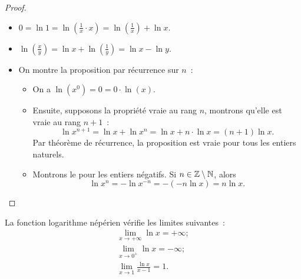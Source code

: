 \begin{proof}
    \begin{itemize}
        \item \( 0 = \ln 1 = \ln \left(\frac{1}{x} \cdot x \right) = \ln 
            \left(\frac{1}{x}\right) + \ln x \).
        \item \( \ln \left(\frac{x}{y}\right)=\ln x + \ln 
            \left(\frac{1}{y}\right)=\ln x - \ln y\).
        \item On montre la proposition par récurrence sur \(n\)~:
            \begin{itemize}
                \item On a \(\ln(x^0) = 0 = 0 \cdot \ln(x)\).
                \item Ensuite, supposons la propriété vraie au rang \(n\), 
                    montrons qu'elle est vraie au rang \(n+1\)~:
                    \begin{equation}
                        \ln x^{n+1} = \ln x + \ln x^n = \ln x + n \cdot \ln 
                        x = (n+1) \ln x.
                    \end{equation}
                    Par théorème de récurrence, la proposition est vraie 
                    pour tous les entiers naturels.
                \item Montrons le pour les entiers négatifs. Si \(n \in 
                    \mathbb{Z}\setminus\mathbb{N}\), alors
                    \begin{equation}
                        \ln x^n = -\ln x^{-n}=-(-n\ln x)=n\ln x.
                    \end{equation}
            \end{itemize}
    \end{itemize}
\end{proof}
\begin{theo}
    \label{theo:limln}
    La fonction logarithme népérien vérifie les limites suivantes~:
    \begin{gather}
        \lim\limits_{x \to + \infty} \ln x = +\infty; \\
        \lim\limits_{x \to 0^{+}} \ln x = -\infty;\\
        \lim\limits_{x \to 1} \frac{\ln x}{x-1}=1.
    \end{gather}
\end{theo}

